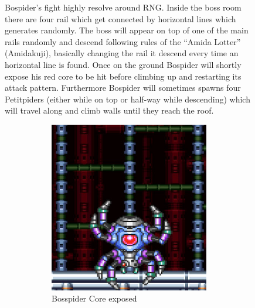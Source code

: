 \begin{figure}[htp]
Bospider's fight highly resolve around RNG. Inside the boss room there are four rail which get connected by horizontal lines which generates randomly. The boss will appear on top of one of the main rails randomly and descend following rules of the ``Amida Lotter'' (Amidakuji), basically changing the rail it descend every time an horizontal line is found. Once on the ground Bospider will shortly expose his red core to be hit before climbing up and restarting its attack pattern. Furthermore Bospider will sometimes spawns four Petitpiders (either while on top or half-way while descending) which will travel along and climb walls until they reach the roof\cite{wiki:Bospider}.
\begin{figure}[htp]
	\centering
	\begin{subfigure}[t]{0.40\linewidth}
		\centering
		\includegraphics[width=\linewidth]{figures/X1/Sigma_stages/Bospider_core.jpg}
		\caption{Bosspider Core exposed}
	\end{subfigure}
	\begin{subfigure}[t]{0.45\linewidth}
		\centering

\end{subfigure}
\end{figure}
\end{figure}
